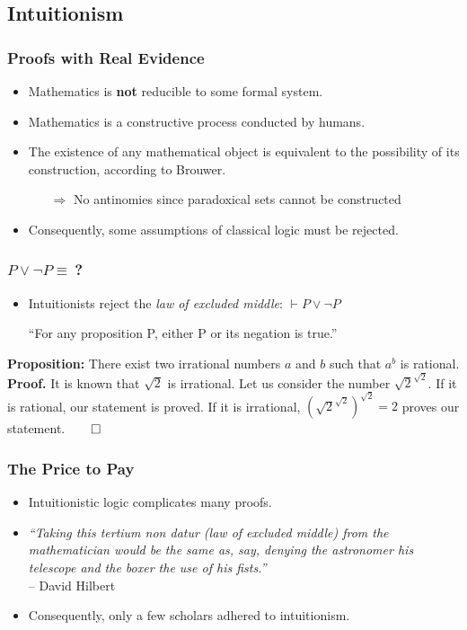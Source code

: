 \documentclass{beamer}
\begin{document}
\subsection{Intuitionism}
\begin{frame}
    \frametitle{Proofs with Real Evidence}
    \begin{itemize}[<+->]
	\item Mathematics is \textbf{not} reducible to some formal system.
	\item Mathematics is a constructive process conducted by humans.
	\item The existence of any mathematical object is equivalent to the possibility of its construction, according to Brouwer.
	\begin{itemize}
		\item[$\Rightarrow$] No antinomies since paradoxical sets cannot be constructed
	\end{itemize}
	\item Consequently, some assumptions of classical logic must be rejected.
    \end{itemize}
\end{frame}
\begin{frame}
    \frametitle{$P\lor\lnot P\equiv\ $?}
    \begin{itemize}[<+->]
	\item Intuitionists reject the \textit{law of excluded middle}: $\vdash P\lor\lnot P$\\
		\begin{centering}
			``For any proposition P, either P or its negation is true.''
		\end{centering}
    \end{itemize}
	\pause[\thebeamerpauses]
	\textbf{Proposition:} There exist two irrational numbers $a$ and $b$ such that $a^b$ is rational.\\\pause
	\vspace{\baselineskip}
	\textbf{Proof.} It is known that $\sqrt{2}$ is irrational. Let us consider the number $\sqrt{2}^{\sqrt{2}}$.\pause$ $ If it is rational, our statement is proved.\pause$ $ If it is irrational, $(\sqrt{2}^{\sqrt{2}})^{\sqrt{2}}=2$ proves our statement.\hfill$\qed$
\end{frame}
\begin{frame}
    \frametitle{The Price to Pay}
    \begin{itemize}[<+->]
	\item Intuitionistic logic complicates many proofs.
	\item \textit{``Taking this tertium non datur (law of excluded middle) from the mathematician would be the same as, say, denying the astronomer his telescope and the boxer the use of his fists.''}\nocite{hilbert_tertium_non_datur}\\\hfill-- David Hilbert
	\item Consequently, only a few scholars adhered to intuitionism.
    \end{itemize}
\end{frame}
\end{document}
